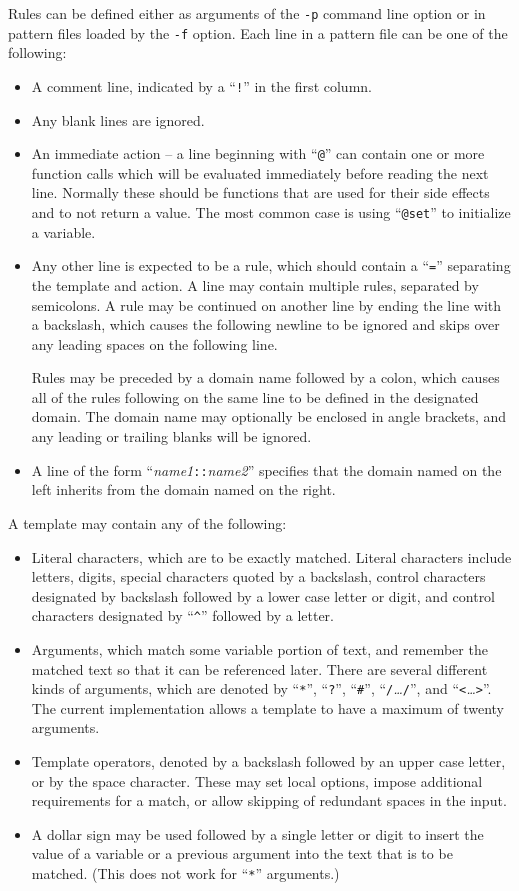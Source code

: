 Rules can be defined either as arguments of the \verb/-p/ command line
option or in pattern files loaded by the \verb/-f/ option.  Each line in
a pattern file can be one of the following:
\begin{itemize}
\item A comment line, indicated by a ``\verb/!/'' in the first column.
\item Any blank lines are ignored.
\item An immediate action -- a line beginning with ``\verb/@/'' can
contain one or more function calls which will be evaluated immediately
before reading the next line.  Normally these should be functions that
are used for their side effects and to not return a value.  The most
common case is using ``\verb/@set/'' to initialize a variable.
\item Any other line is expected to be a rule, which should contain a
``\verb/=/'' separating the template and action.  A line may contain
multiple rules, separated by semicolons.  A rule may be continued on
another line by ending the line with a backslash, which causes the
following newline to be ignored and skips over any leading spaces on the
following line.

Rules may be preceded by a domain name followed by a colon, which causes
all of the rules following on the same line to be defined in the
designated domain.  The domain name may optionally be enclosed in angle
brackets, and any leading or trailing blanks will be ignored.
\item A line of the form ``{\em name1}{\tt ::}{\em name2}'' specifies
that the domain named on the left inherits from the domain named on the
right.
\end{itemize}

A template may contain any of the following:
\begin{itemize}
\item Literal characters, which are to be exactly matched.
Literal characters include letters, digits, special characters quoted by
a backslash, control characters designated by backslash followed by
a lower case letter or digit, and control characters designated by
``\verb/^/'' followed by a letter.
\item Arguments, which match some variable portion of text, and remember
the matched text so that it can be referenced later.
There are several different kinds of arguments, which are denoted by
``\verb/*/'', ``\verb/?/'', ``\verb/#/'', ``{\tt /}{\em \ldots}{\tt /}'',
and ``{\tt <}{\em \ldots}{\tt >}''.
The current implementation allows a template to have a maximum of twenty
arguments.
\item Template operators, denoted by a backslash followed by an upper
case letter, or by the space character.  These may set local options,
impose additional
requirements for a match, or allow skipping of redundant spaces in
the input.
\item A dollar sign may be used followed by a single letter or digit to
insert the value of a variable or a previous argument into the text that
is to be matched.  (This does not work for ``\verb/*/'' arguments.)
\end{itemize}

